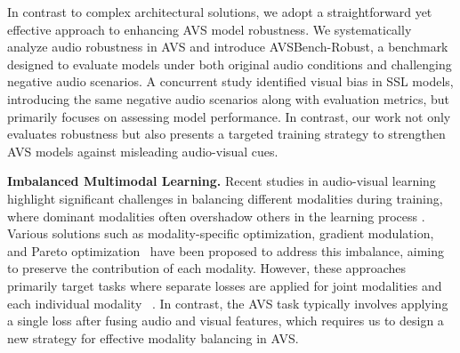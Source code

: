 In contrast to complex architectural solutions, we adopt a straightforward yet effective approach to enhancing AVS model robustness. We systematically analyze audio robustness in AVS and introduce AVSBench-Robust, a benchmark designed to evaluate models under both original audio conditions and challenging negative audio scenarios. 
A concurrent study \cite{juanola2024critical} identified visual bias in SSL models, introducing the same negative audio scenarios along with evaluation metrics, but primarily focuses on assessing model performance.
In contrast, our work not only evaluates robustness but also presents a targeted training strategy to strengthen AVS models against misleading audio-visual cues.

\vspace{2mm}
\noindent
\textbf{Imbalanced Multimodal Learning.}
Recent studies in audio-visual learning highlight significant challenges in balancing different modalities during training, where dominant modalities often overshadow others in the learning process \cite{wang2020mmlhard,tian2020unified,wei2024mmpareto, peng2022balanced}. Various solutions such as modality-specific optimization, gradient modulation, and Pareto optimization~\cite{wang2020mmlhard, wei2024mmpareto, peng2022balanced} have been proposed to address this imbalance, aiming to preserve the contribution of each modality. However, these approaches primarily target tasks where separate losses are applied for joint modalities and each individual modality ~\cite{wang2020mmlhard, wei2024mmpareto}. In contrast, the AVS task typically involves applying a single loss after fusing audio and visual features, which requires us to design a new strategy for effective modality balancing in AVS.